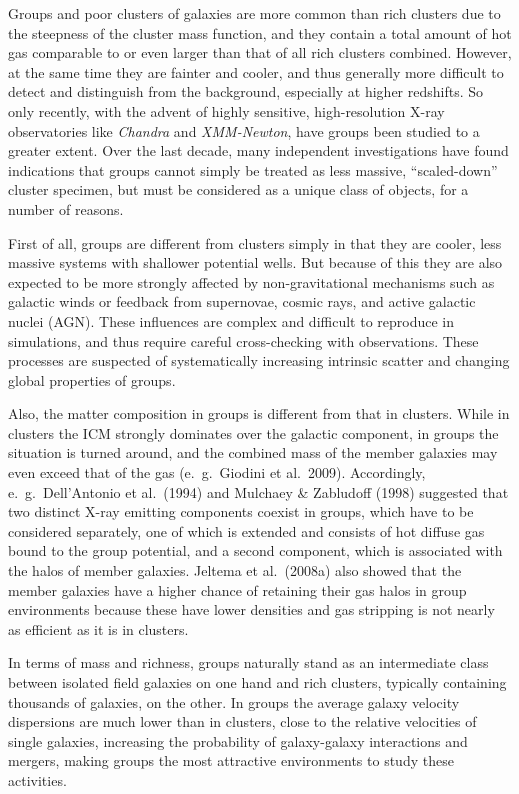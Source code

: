 \documentclass[structabstract]{aa}
\begin{document}
Groups and poor clusters of galaxies are more common than rich
clusters due to the steepness of the cluster mass function, and they contain a
total amount of hot gas comparable to or even larger than that of all rich
clusters combined. However, at the same time they are fainter and cooler, and
thus generally more difficult to detect and distinguish from the background,
especially at higher redshifts. So only recently, with the advent of highly
sensitive, high-resolution X-ray observatories like \emph{Chandra} and
\emph{XMM-Newton}, have groups been studied to a greater extent. Over the last
decade, many independent investigations have found indications that groups
cannot simply be treated as less massive, ``scaled-down'' cluster specimen,
but must be considered as a unique class of objects, for a number of reasons.

First of all, groups are different from clusters simply in that they are
cooler, less massive systems with shallower potential wells. But because
of this they are also expected to be more strongly affected by
non-gravitational mechanisms such as galactic winds or feedback from
supernovae, cosmic rays, and active galactic nuclei (AGN). These
influences are complex and difficult to reproduce in simulations, and
thus require careful cross-checking with observations. These processes
are suspected of systematically increasing intrinsic scatter and
changing global properties of groups.

Also, the matter composition in groups is different from that in
clusters. While in clusters the ICM strongly dominates over the
galactic component, in groups the situation is turned around, and the
combined mass of the member galaxies may even exceed that of the gas
(e.\ g.\ Giodini et al.\ 2009). Accordingly, e.\ g.\ Dell'Antonio et
al.\ (1994) and Mulchaey \& Zabludoff (1998) suggested that two
distinct X-ray emitting components coexist in groups, which have to be
considered separately, one of which is extended and consists of hot
diffuse gas bound to the group potential, and a second component,
which is associated with the halos of member galaxies. Jeltema et al.\
(2008a) also showed that the member galaxies have a higher chance of
retaining their gas halos in group environments because these have
lower densities and gas stripping is not nearly as efficient as it is
in clusters.

In terms of mass and richness, groups naturally stand as an intermediate class between
isolated field galaxies on one hand and rich clusters, typically containing
thousands of galaxies, on the other. In groups the average galaxy velocity
dispersions are much lower than in clusters, close to the relative velocities
of single galaxies, increasing the probability of galaxy-galaxy interactions
and mergers, making groups the most attractive environments to study these
activities.
\end{document}
